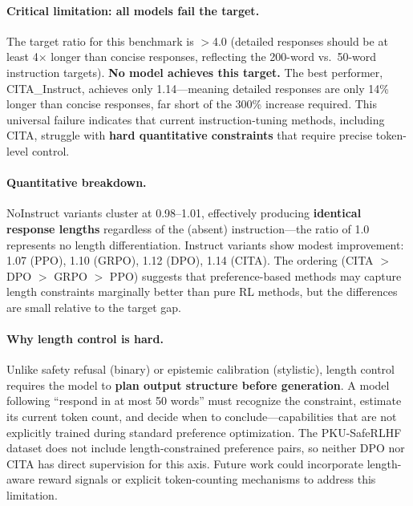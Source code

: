 \paragraph{Critical limitation: all models fail the target.}
The target ratio for this benchmark is $>$4.0 (detailed responses should be at least 4$\times$ longer than concise responses, reflecting the 200-word vs.\ 50-word instruction targets).
\textbf{No model achieves this target.}
The best performer, \textsc{CITA}\_Instruct, achieves only 1.14---meaning detailed responses are only 14\% longer than concise responses, far short of the 300\% increase required.
This universal failure indicates that current instruction-tuning methods, including \textsc{CITA}, struggle with \textbf{hard quantitative constraints} that require precise token-level control.

\paragraph{Quantitative breakdown.}
NoInstruct variants cluster at 0.98--1.01, effectively producing \textbf{identical response lengths} regardless of the (absent) instruction---the ratio of 1.0 represents no length differentiation.
Instruct variants show modest improvement: 1.07 (\textsc{PPO}), 1.10 (\textsc{GRPO}), 1.12 (\textsc{DPO}), 1.14 (\textsc{CITA}).
The ordering (\textsc{CITA} $>$ \textsc{DPO} $>$ \textsc{GRPO} $>$ \textsc{PPO}) suggests that preference-based methods may capture length constraints marginally better than pure RL methods, but the differences are small relative to the target gap.

\paragraph{Why length control is hard.}
Unlike safety refusal (binary) or epistemic calibration (stylistic), length control requires the model to \textbf{plan output structure before generation}.
A model following ``respond in at most 50 words'' must recognize the constraint, estimate its current token count, and decide when to conclude---capabilities that are not explicitly trained during standard preference optimization.
The PKU-SafeRLHF dataset does not include length-constrained preference pairs, so neither DPO nor \textsc{CITA} has direct supervision for this axis.
Future work could incorporate length-aware reward signals or explicit token-counting mechanisms to address this limitation.

